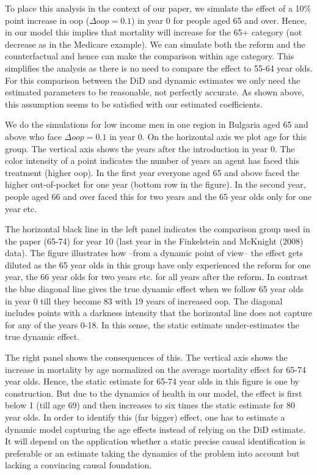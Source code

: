 \documentclass[a4paper,12pt]{article}
\makeatletter
\newcommand{\cslcitation}[2]
 {\protect\hyper@linkstart{cite}{citeproc_bib_item_#1}#2\hyper@linkend}
\makeatother
\begin{document}
To place this analysis in the context of our paper, we simulate the effect of a 10\% point increase in oop (\(\Delta oop = 0.1\)) in year 0 for people aged 65 and over. Hence, in our model this implies that mortality will increase for the 65+ category (not decrease as in the Medicare example). We can simulate both the reform and the counterfactual and hence can make the comparison within age category. This simplifies the analysis as there is no need to compare the effect to 55-64 year olds. For this comparison between the DiD and dynamic estimates we only need the estimated parameters to be reasonable, not perfectly accurate. As shown above, this assumption seems to be satisfied with our estimated coefficients.

We do the simulations for low income men in one region in Bulgaria aged 65 and above who face \(\Delta oop = 0.1\) in year 0. On the horizontal axis we plot age for this group. The vertical axis shows the years after the introduction in year 0. The color intensity of a point indicates the number of years an agent has faced this treatment (higher oop). In the first year everyone aged 65 and above faced the higher out-of-pocket for one year (bottom row in the figure). In the second year, people aged 66 and over faced this for two years and the 65 year olds only for one year etc.

The horizontal black line in the left panel indicates the comparison group used in the paper (65-74) for year 10 (last year in the Finkelstein and McKnight (\cslcitation{4}{2008}) data). The figure illustrates how --from a dynamic point of view-- the effect gets diluted as the 65 year olds in this group have only experienced the reform for one year, the 66 year olds for two years etc. for all years after the reform. In contrast the blue diagonal line gives the true dynamic effect when we follow 65 year olds in year 0 till they become 83 with 19 years of increased oop. The diagonal includes points with a darkness intensity that the horizontal line does not capture for any of the years 0-18. In this sense, the static estimate under-estimates the true dynamic effect.

The right panel shows the consequences of this. The vertical axis shows the increase in mortality by age normalized on the average mortality effect for 65-74 year olds. Hence, the static estimate for 65-74 year olds in this figure is one by construction. But due to the dynamics of health in our model, the effect is first below 1 (till age 69) and then increases to six times the static estimate for 80 year olds. In order to identify this (far bigger) effect, one has to estimate a dynamic model capturing the age effects instead of relying on the DiD estimate. It will depend on the application whether a static precise causal identification is preferable or an estimate taking the dynamics of the problem into account but lacking a convincing causal foundation.
\end{document}
